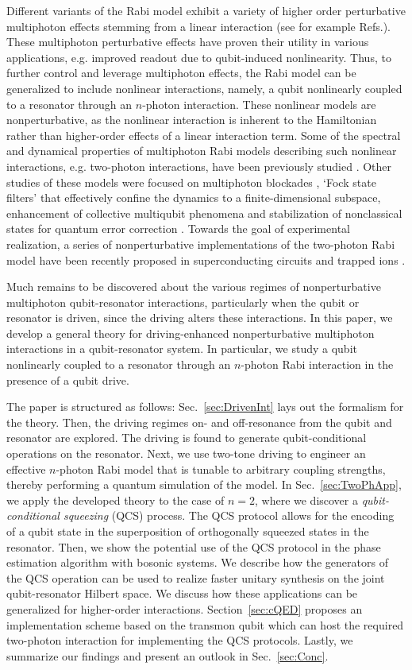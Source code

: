 Different variants of the Rabi model exhibit a variety of higher order perturbative multiphoton effects stemming from a linear interaction (see for example Refs.).  These multiphoton perturbative effects have proven their utility in various applications, e.g. improved readout due to qubit-induced nonlinearity. Thus, to further control and leverage multiphoton effects, the Rabi model can be generalized to include nonlinear interactions, namely, a qubit nonlinearly coupled to a resonator through an $n$-photon interaction. These nonlinear models are nonperturbative, as the nonlinear interaction is inherent to the Hamiltonian rather than higher-order effects of a linear interaction term. Some of the spectral and dynamical properties of multiphoton Rabi models describing such nonlinear interactions, e.g. two-photon interactions, have been previously studied . Other studies of these models were focused on multiphoton blockades , `Fock state filters' that effectively confine the dynamics to a finite-dimensional subspace, enhancement of collective multiqubit phenomena  and stabilization of nonclassical states for quantum error correction \cite{}. Towards the goal of experimental realization, a series of nonperturbative implementations of the two-photon Rabi model have been recently proposed in superconducting circuits \cite{} and trapped ions \cite{}.


Much remains to be discovered about the various regimes of nonperturbative multiphoton qubit-resonator interactions, particularly when the qubit or resonator is driven, since the driving alters these interactions. In this paper, we develop a general theory for driving-enhanced nonperturbative multiphoton interactions in a qubit-resonator system. In particular, we study a qubit nonlinearly coupled to a resonator through an $n$-photon Rabi interaction in the presence of a qubit drive. 

The paper is structured as follows: Sec.~\ref{sec:DrivenInt} lays out the formalism for the theory. Then, the driving regimes on- and off-resonance from the qubit and resonator are explored. The driving is found to generate qubit-conditional operations on the resonator. {Next, we use two-tone driving to engineer an effective $n$-photon Rabi model that is tunable to arbitrary coupling strengths, thereby performing a quantum simulation of the model.} In Sec.~\ref{sec:TwoPhApp}, we apply the developed theory to the case of $n=2$, where we discover a \textit{qubit-conditional squeezing} (QCS) process. The QCS protocol allows for the encoding of a qubit state in the superposition of orthogonally squeezed states in the resonator. {Then, we show the potential use of the QCS protocol in the phase estimation algorithm with bosonic systems. We describe how the generators of the QCS operation can be used to realize faster unitary synthesis on the joint qubit-resonator Hilbert space.} We discuss how these applications can be generalized for higher-order interactions. Section~\ref{sec:cQED} proposes an implementation scheme based on the transmon qubit which can host the required two-photon interaction for implementing the QCS protocols. Lastly, we summarize our findings and present an outlook in Sec.~\ref{sec:Conc}.


